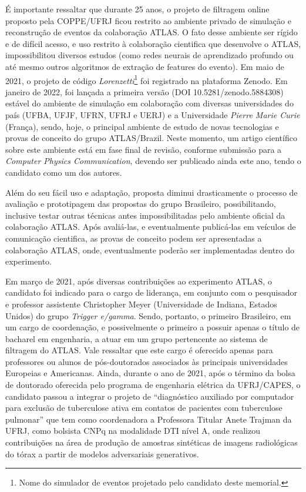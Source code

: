 É importante ressaltar que durante 25 anos, o projeto de filtragem online proposto pela COPPE/UFRJ 
ficou restrito ao ambiente privado de simulação e reconstrução de eventos da colaboração ATLAS. 
O fato desse ambiente ser rígido e de difícil acesso, e uso restrito à colaboração cientifica que 
desenvolve o ATLAS, impossibilitou diversos estudos (como redes neurais de aprendizado profundo 
ou até mesmo outros algoritmos de extração de features do evento). Em maio de 2021, o projeto de 
código \emph{Lorenzetti}\footnote{Nome do simulador de eventos projetado pelo candidato deste memorial.} 
foi registrado na plataforma Zenodo. Em janeiro de 2022, foi lançada a primeira 
versão (DOI 10.5281/zenodo.5884308) estável do ambiente de simulação em colaboração com diversas 
universidades do país (UFBA, UFJF, UFRN, UFRJ e UERJ) e a Universidade \emph{Pierre Marie Curie} (França), 
sendo, hoje, o principal ambiente de estudo de novas tecnologias e provas de conceito do grupo ATLAS/Brazil. 
Neste momento, um artigo científico sobre este ambiente está em fase final de revisão, conforme submissão 
para a \emph{Computer Physics Communication}, devendo ser publicado ainda este ano, tendo o candidato 
como um dos autores.


Além do seu fácil uso e adaptação, proposta diminui drasticamente o processo de avaliação e prototipagem 
das propostas do grupo Brasileiro, possibilitando, inclusive testar outras técnicas antes impossibilitadas 
pelo ambiente oficial da colaboração ATLAS. Após avaliá-las, e eventualmente publicá-las em veículos de 
comunicação cientifica, as provas de conceito podem ser apresentadas a colaboração ATLAS, onde, eventualmente 
poderão ser implementadas dentro do experimento.


Em março de 2021, após diversas contribuições ao experimento ATLAS, o candidato foi indicado para o cargo de 
liderança, em conjunto com o pesquisador e professor assistente Christopher Meyer (Universidade de 
Indiana, Estados Unidos) do grupo \emph{Trigger e/gamma}. Sendo, portanto, o primeiro Brasileiro, em um cargo 
de coordenação, e possivelmente o primeiro a possuir apenas o título de bacharel em engenharia, a atuar em um 
grupo pertencente ao sistema de filtragem do ATLAS. Vale ressaltar que este cargo é oferecido apenas para 
professores ou alunos de pós-doutorados associados às principais universidades Europeias e Americanas. 
Ainda, durante o ano de 2021, após o término da bolsa de doutorado oferecida pelo programa de engenharia 
elétrica da UFRJ/CAPES, o candidato passou a integrar o projeto de “diagnóstico auxiliado por computador 
para exclusão de tuberculose ativa em contatos de pacientes com tuberculose pulmonar” que tem como 
coordenadora a Professora Titular Anete Trajman da UFRJ, como bolsista CNPq na modalidade DTI nível A, onde 
realizou contribuições na área de produção de amostras sintéticas de imagens radiológicas do tórax a partir 
de modelos adversariais generativos.



